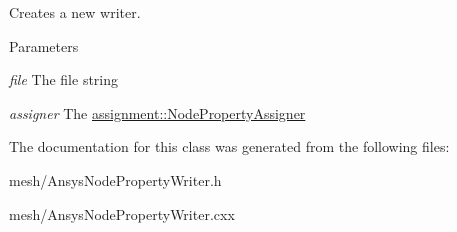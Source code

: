 Creates a new writer. 


\begin{DoxyParams}{Parameters}
\item[{\em file}]The file string \item[{\em assigner}]The \hyperlink{classassignment_1_1_node_property_assigner}{assignment::NodePropertyAssigner} \end{DoxyParams}


The documentation for this class was generated from the following files:\begin{DoxyCompactItemize}
\item 
mesh/AnsysNodePropertyWriter.h\item 
mesh/AnsysNodePropertyWriter.cxx\end{DoxyCompactItemize}
